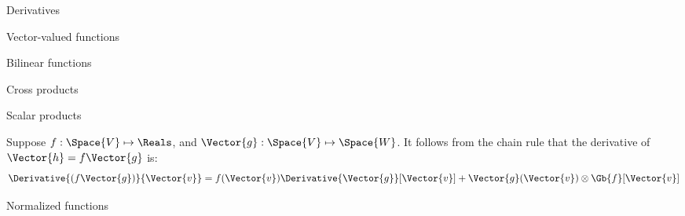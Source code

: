 \begin{plSection}{Derivatives}
\begin{plSection}{Vector-valued functions}
\begin{plSection}{Bilinear functions}
\begin{plSection}{Cross products}
\end{plSection}%
\end{plSection}%
\begin{plSection}{Scalar products}
\label{sec:Derivatives-of-scalar-products}

Suppose
$f:\Space{V} \mapsto \Reals$, and
$\Vector{g}:\Space{V} \mapsto \Space{W}$.
It follows from the chain rule that the derivative of $\Vector{h} = f\Vector{g}$ is:
\begin{equation}
\label{eq:scalar_product_derivative}
\Derivative{(f\Vector{g})}{\Vector{v}} 
=  f(\Vector{v}) \Derivative{\Vector{g}}[\Vector{v}] 
+ \Vector{g}(\Vector{v}) \otimes \Gb{f}[\Vector{v}]
\end{equation}

\end{plSection}%
\begin{plSection}{Normalized functions}
\label{sec:Derivatives-of-normalized-functionss}


\end{plSection}
\end{plSection}
\end{plSection}

